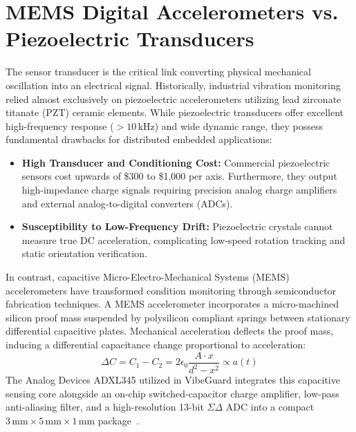 \section{MEMS Digital Accelerometers vs. Piezoelectric Transducers}
The sensor transducer is the critical link converting physical mechanical oscillation into an electrical signal. Historically, industrial vibration monitoring relied almost exclusively on piezoelectric accelerometers utilizing lead zirconate titanate (PZT) ceramic elements. While piezoelectric transducers offer excellent high-frequency response ($>10$\,kHz) and wide dynamic range, they possess fundamental drawbacks for distributed embedded applications:
\begin{itemize}
    \item \textbf{High Transducer and Conditioning Cost:} Commercial piezoelectric sensors cost upwards of \$300 to \$1,000 per axis. Furthermore, they output high-impedance charge signals requiring precision analog charge amplifiers and external analog-to-digital converters (ADCs).
    \item \textbf{Susceptibility to Low-Frequency Drift:} Piezoelectric crystals cannot measure true DC acceleration, complicating low-speed rotation tracking and static orientation verification.
\end{itemize}

In contrast, capacitive Micro-Electro-Mechanical Systems (MEMS) accelerometers have transformed condition monitoring through semiconductor fabrication techniques. A MEMS accelerometer incorporates a micro-machined silicon proof mass suspended by polysilicon compliant springs between stationary differential capacitive plates. Mechanical acceleration deflects the proof mass, inducing a differential capacitance change proportional to acceleration:
\begin{equation}
\Delta C = C_1 - C_2 = 2 \epsilon_0 \frac{A \cdot x}{d^2 - x^2} \propto a(t)
\end{equation}
The Analog Devices ADXL345 utilized in VibeGuard integrates this capacitive sensing core alongside an on-chip switched-capacitor charge amplifier, low-pass anti-aliasing filter, and a high-resolution 13-bit $\Sigma\Delta$ ADC into a compact $3\,\text{mm} \times 5\,\text{mm} \times 1\,\text{mm}$ package~\cite{adxl345_datasheet}. 

